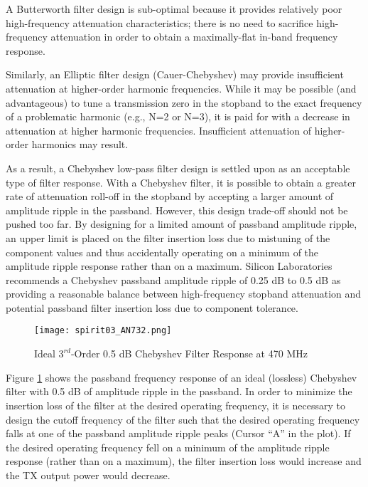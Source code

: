         A Butterworth filter design is sub-optimal because it provides relatively poor 
        high-frequency attenuation characteristics; there is no need to sacrifice high-frequency 
        attenuation in order to obtain a maximally-flat in-band frequency response.
        
        Similarly, an Elliptic filter design (Cauer-Chebyshev) may provide insufficient attenuation 
        at higher-order harmonic frequencies. While it may be possible (and advantageous) to tune a 
        transmission zero in the stopband to the exact frequency of a problematic harmonic (e.g., 
        N=2 or N=3), it is paid for with a decrease in attenuation at higher harmonic frequencies. 
        Insufficient attenuation of higher-order harmonics may result.
        
        As a result, a Chebyshev low-pass filter design is settled upon as an acceptable type of 
        filter response. With a Chebyshev filter, it is possible to obtain a greater rate of 
        attenuation roll-off in the stopband by accepting a larger amount of amplitude ripple in 
        the passband. However, this design trade-off should not be pushed too far. By designing for 
        a limited amount of passband amplitude ripple, an upper limit is placed on the filter 
        insertion loss due to mistuning of the component values and thus accidentally operating on 
        a minimum of the amplitude ripple response rather than on a maximum. Silicon Laboratories 
        recommends a Chebyshev passband amplitude ripple of 0.25 dB to 0.5 dB as providing a 
        reasonable balance between high-frequency stopband attenuation and potential passband 
        filter insertion loss due to component tolerance.
       
        \begin{figure}[ht!]  %
          \centering
          \texttt{[image: spirit03\_AN732.png]}
          \caption{Ideal \(3^{rd}\)-Order 0.5 dB Chebyshev Filter Response at 470 MHz 
                   \cite[s.~18]{AN648SiliconLabs}}
          \label{EXP001:fig_spirit03}
        \end{figure} 
        
        Figure \ref{EXP001:fig_spirit03} shows the passband frequency response of an ideal 
        (lossless) Chebyshev filter with 0.5 dB of amplitude ripple in the passband. In order to 
        minimize the insertion loss of the filter at the desired operating frequency, it is 
        necessary to design the cutoff frequency of the filter such that the desired operating 
        frequency falls at one of the  passband amplitude ripple peaks (Cursor “A” in the plot). If 
        the desired operating frequency fell on a minimum of the amplitude ripple response (rather 
        than on a maximum), the filter insertion loss would increase and the TX output power would 
        decrease.
        
